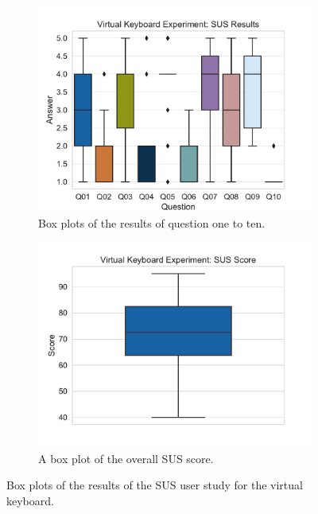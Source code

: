 \begin{figure}[H]
	\centering
	\begin{subfigure}{.5\linewidth}%
		\centering
		\includegraphics[width=\linewidth]{figures/evaluation/res_exp_vk.pdf}
		\caption{Box plots of the results of question one to ten.}\label{fig:res-exp-vk}
	\end{subfigure}%
	\begin{subfigure}{.5\linewidth}%
		\centering
		\includegraphics[width=\linewidth]{figures/evaluation/score_exp_vk.pdf}
		\caption{A box plot of the overall \gls{SUS} score.}\label{fig:score-exp-vk}
	\end{subfigure}%
	\caption[Virtual keyboard SUS results]{Box plots of the results of the \gls{SUS} user study for the virtual keyboard.}\label{fig:exp-vk-stats}
\end{figure}

